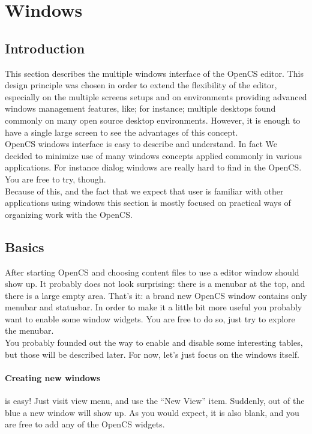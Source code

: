 \section{Windows}
\subsection{Introduction}
This section describes the multiple windows interface of the OpenCS editor. This design principle was chosen in order to extend the flexibility of the editor, especially on the multiple screens setups and on environments providing advanced windows management features, like; for instance; multiple desktops found commonly on many open source desktop environments. However, it is enough to have a single large screen to see the advantages of this concept.\\
OpenCS windows interface is easy to describe and understand. In fact We decided to minimize use of many windows concepts applied commonly in various applications. For instance dialog windows are really hard to find in the OpenCS. You are free to try, though.\\
Because of this, and the fact that we expect that user is familiar with other applications using windows this section is mostly focused on practical ways of organizing work with the OpenCS.

\subsection{Basics}
After starting Open{CS} and choosing content files to use a editor window should show up. It probably does not look surprising: there is a menubar at the top, and there is a large empty area. That's it: a brand new Open{CS} window contains only menubar and statusbar. In order to make it a little bit more useful you probably want to enable some window widgets. You are free to do so, just try to explore the menubar. \\
You probably founded out the way to enable and disable some interesting tables, but those will be described later. For now, let's just focus on the windows itself.

\paragraph{Creating new windows}
is easy! Just visit view menu, and use the ``New View'' item. Suddenly, out of the blue a new window will show up. As you would expect, it is also blank, and you are free to add any of the Open{CS} widgets.